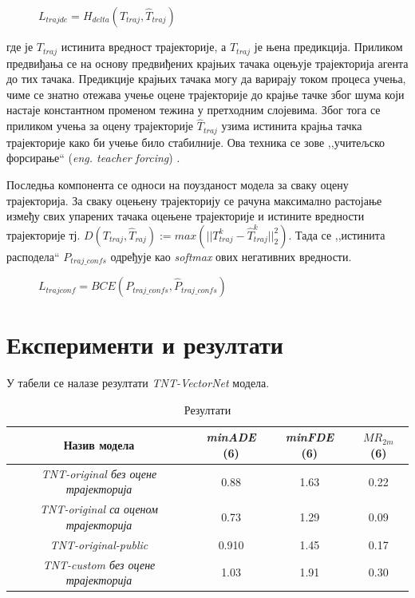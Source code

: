 \documentclass[11pt,oneside]{memoir}
\begin{document}
\begin{figure}[H]
  \centering
  $L_{trajde} = H_{delta} (T_{traj}, \hat{T}_{traj})$
\end{figure}

\noindent где је $T_{traj}$ истинита вредност трајекторије, а $\hat{T}_{traj}$ је њена предикција. Приликом предвиђања се
на основу предвиђених крајњих тачака оцењује трајекторија агента до тих тачака. Предикције крајњих тачака могу да варирају током процеса учења,
чиме се знатно отежава учење оцене трајекторије до крајње тачке због шума који настаје константном променом тежина у претходним слојевима.
Због тога се приликом учења за оцену трајекторије
$\hat{T}_{traj}$ узима истинита крајња тачка трајекторије како би учење било стабилније. Ова техника се зове ,,учитељско форсирање`` (\textit{eng. teacher forcing}) \cite{teacher_forcing}.

Последња компонента се односи на поузданост модела за сваку оцену трајекторија. За сваку оцењену трајекторију се рачуна максимално растојање
између свих упарених тачака оцењене трајекторије и истините вредности трајекторије тј.
$D(T_{traj}, \hat{T}_{raj}) := max(||T^{k}_{traj} - \hat{T}^{k}_{traj}||^{2}_{2})$. Тада се ,,истинита расподела`` $P_{traj\_confs}$ одређује као \textit{softmax} 
ових негативних вредности.

\begin{figure}[H]
  \centering
  $L_{trajconf} = BCE(P_{traj\_confs}, \hat{P}_{traj\_confs})$
\end{figure}

\section{Експерименти и резултати}

У табели  се налазе резултати \textit{TNT-VectorNet} модела. 

\begin{table}[H]
  \begin{tabular}{c|c|c|c}
    Назив модела & \textit{minADE} (6) & \textit{minFDE} (6) & $MR_{2m}$ (6) \\
    \hline
    \textit{TNT-original без оцене трајекторија} & 0.88 & 1.63 & 0.22 \\
    \textit{TNT-original са оценом трајекторија} & 0.73 & 1.29 & 0.09 \\
    \textit{TNT-original-public} & 0.910 & 1.45 & 0.17 \\
    \textit{TNT-custom без оцене трајекторија}  & 1.03 & 1.91 & 0.30
  \end{tabular}
  \caption{Резултати}
  \label{vectornet-results}
\end{table}
\end{document}
